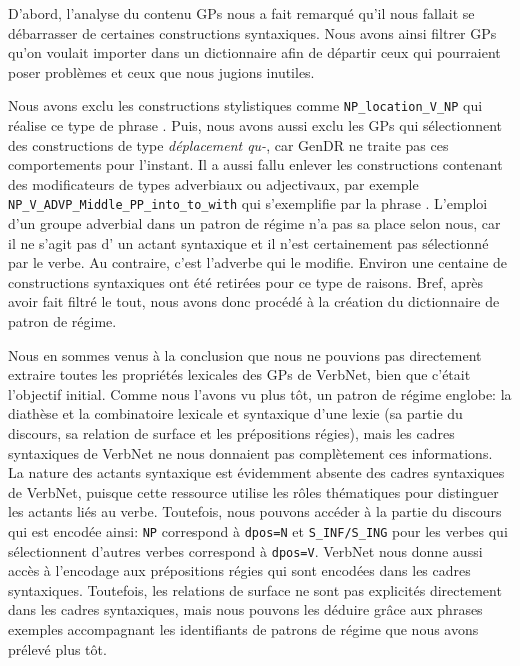 D'abord, l'analyse du contenu \acp{GP} nous a fait remarqué qu'il nous fallait se débarrasser de certaines constructions syntaxiques. Nous avons ainsi filtrer \acp{GP} qu'on voulait importer dans un dictionnaire afin de départir ceux qui pourraient poser problèmes et ceux que nous jugions inutiles. 

Nous avons exclu les constructions stylistiques comme \lstinline|NP_location_V_NP| qui réalise ce type de phrase . Puis, nous avons aussi exclu les \acp{GP} qui sélectionnent des constructions de type \emph{déplacement qu-}, car GenDR ne traite pas ces comportements pour l'instant. Il a aussi fallu enlever les constructions contenant des modificateurs de types adverbiaux ou adjectivaux, par exemple \lstinline|NP_V_ADVP_Middle_PP_into_to_with| qui s'exemplifie par la phrase . L'emploi d'un groupe adverbial dans un patron de régime n'a pas sa place selon nous, car il ne s'agit pas d' un actant syntaxique et il n'est certainement pas sélectionné par le verbe. Au contraire, c'est l'adverbe qui le modifie. Environ une centaine de constructions syntaxiques ont été retirées pour ce type de raisons. Bref, après avoir fait filtré le tout, nous avons donc procédé à la création du dictionnaire de patron de régime. 

Nous en sommes venus à la conclusion que nous ne pouvions pas directement extraire toutes les propriétés lexicales des \acp{GP} de VerbNet, bien que c'était l'objectif initial. Comme nous l'avons vu plus tôt, un patron de régime englobe: la diathèse et la combinatoire lexicale et syntaxique d'une lexie (sa partie du discours, sa relation de surface et les prépositions régies), mais les cadres syntaxiques de VerbNet ne nous donnaient pas complètement ces informations. La nature des actants syntaxique est évidemment absente des cadres syntaxiques de VerbNet, puisque cette ressource utilise les rôles thématiques pour distinguer les actants liés au verbe. Toutefois, nous pouvons accéder à la partie du discours qui est encodée ainsi: \texttt{NP} correspond à \texttt{dpos=N} et \texttt{S\_INF/S\_ING} pour les verbes qui sélectionnent d'autres verbes correspond à \texttt{dpos=V}. VerbNet nous donne aussi accès à l'encodage aux prépositions régies qui sont encodées dans les cadres syntaxiques. Toutefois, les relations de surface ne sont pas explicités directement dans les cadres syntaxiques, mais nous pouvons les déduire grâce aux phrases exemples accompagnant les identifiants de patrons de régime que nous avons prélevé plus tôt.


